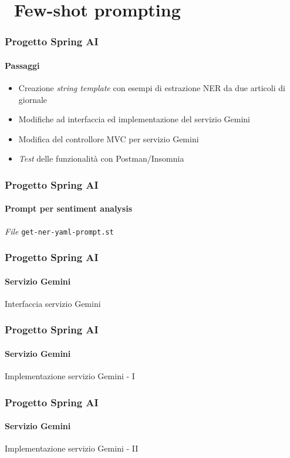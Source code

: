 \section{\faWrench\ Few-shot prompting} %
\label{sec:spring-ai-gemini-few-shot-prompting}
%
\begin{frame}[t,fragile] \frametitle{Progetto Spring AI}
    \framesubtitle{Passaggi}
    {\small
        \begin{itemize}[leftmargin=10pt,align=right]
            \item[\alertedcircled{1}] Creazione \textit{string template} con esempi di estrazione NER da due articoli di giornale
            \item[\alertedcircled{2}] Modifiche ad interfaccia ed implementazione del servizio Gemini
            \item[\alertedcircled{3}] Modifica del controllore MVC per servizio Gemini
            \item[\alertedcircled{4}] \textit{Test} delle funzionalità con Postman/Insomnia 
        \end{itemize}
    }
\end{frame}
%
\begin{frame}[t,fragile] \frametitle{Progetto Spring AI}
    \framesubtitle{Prompt per sentiment analysis}
        \vspace*{-.7cm}
        \begin{block}{\textit{File} \texttt{get-ner-yaml-prompt.st}}
			{\Tiny}
    	\end{block}
\end{frame}
%
\begin{frame}[t,fragile] \frametitle{Progetto Spring AI}
    \framesubtitle{Servizio Gemini}
        \begin{block}{Interfaccia servizio Gemini}
{\tiny}
    \end{block}
\end{frame}
%
\begin{frame}[t,fragile] \frametitle{Progetto Spring AI}
    \framesubtitle{Servizio Gemini}
		\vspace*{-.7cm}
        \begin{block}{Implementazione servizio Gemini - I}
            {\tiny}
    \end{block}
\end{frame}
%
\begin{frame}[t,fragile] \frametitle{Progetto Spring AI}
    \framesubtitle{Servizio Gemini}
        \vspace*{-.7cm}
        \begin{block}{Implementazione servizio Gemini - II}
            {\tiny}
    \end{block}
\end{frame}
